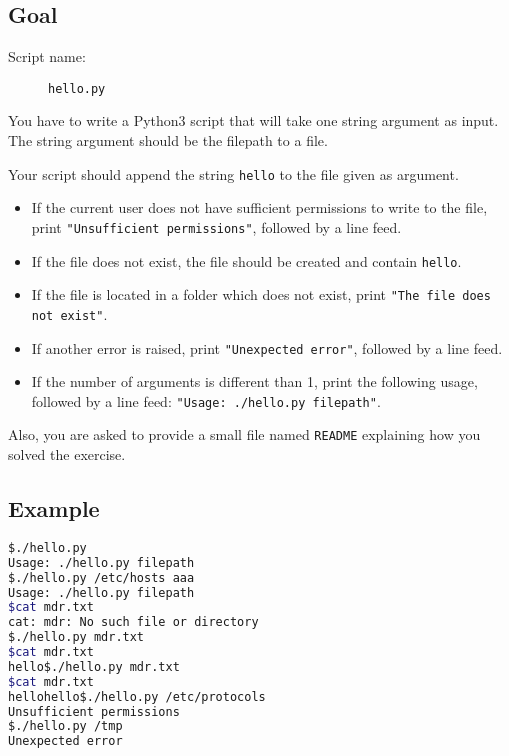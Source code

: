 \documentclass[12pt]{article}
\begin{document}
\subsection{Goal}

\begin{description}
        \item[Script name:] \texttt{hello.py}
\end{description}

You have to write a Python3 script that will take one string argument as input. The string argument should be the filepath to a file.

Your script should append the string \texttt{hello} to the file given as argument.

\begin{itemize}
\item If the current user does not have sufficient permissions to write to the file, print \texttt{"Unsufficient permissions"}, followed by a line feed.

\item If the file does not exist, the file should be created and contain \texttt{hello}.

\item If the file is located in a folder which does not exist, print \texttt{"The file does not exist"}.

\item If another error is raised, print \texttt{"Unexpected error"}, followed by a line feed.

\item If the number of arguments is different than 1, print the following usage, followed by a line feed: \texttt{"Usage: ./hello.py filepath"}.
\end{itemize}

Also, you are asked to provide a small file named \texttt{README} explaining how you solved the exercise.

\subsection{Example}

\begin{lstlisting}[language=bash]
$./hello.py 
Usage: ./hello.py filepath
$./hello.py /etc/hosts aaa
Usage: ./hello.py filepath
$cat mdr.txt
cat: mdr: No such file or directory
$./hello.py mdr.txt
$cat mdr.txt
hello$./hello.py mdr.txt
$cat mdr.txt
hellohello$./hello.py /etc/protocols
Unsufficient permissions
$./hello.py /tmp
Unexpected error
\end{lstlisting}
\end{document}
